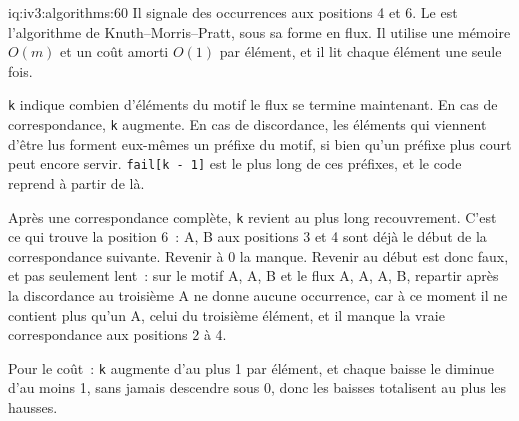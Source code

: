 \begin{solution}{iq:iv3:algorithms:60}
Il signale des occurrences aux positions 4 et 6. Le  est l'algorithme de Knuth--Morris--Pratt, sous sa forme en flux. Il utilise une mémoire $O(m)$ et un coût amorti $O(1)$ par élément, et il lit chaque élément une seule fois.
\label{lst:iv3:al:kmp}

\texttt{k} indique combien d'éléments du motif le flux se termine maintenant. En cas de correspondance, \texttt{k} augmente. En cas de discordance, les éléments qui viennent d'être lus forment eux-mêmes un préfixe du motif, si bien qu'un préfixe plus court peut encore servir. \texttt{fail[k - 1]} est le plus long de ces préfixes, et le code reprend à partir de là.

Après une correspondance complète, \texttt{k} revient au plus long recouvrement. C'est ce qui trouve la position 6~: A, B aux positions 3 et 4 sont déjà le début de la correspondance suivante. Revenir à 0 la manque. Revenir au début est donc faux, et pas seulement lent~: sur le motif A, A, B et le flux A, A, A, B, repartir après la discordance au troisième A ne donne aucune occurrence, car à ce moment il ne contient plus qu'un A, celui du troisième élément, et il manque la vraie correspondance aux positions 2 à 4.

Pour le coût~: \texttt{k} augmente d'au plus 1 par élément, et chaque baisse le diminue d'au moins 1, sans jamais descendre sous 0, donc les baisses totalisent au plus les hausses.

\end{solution}

